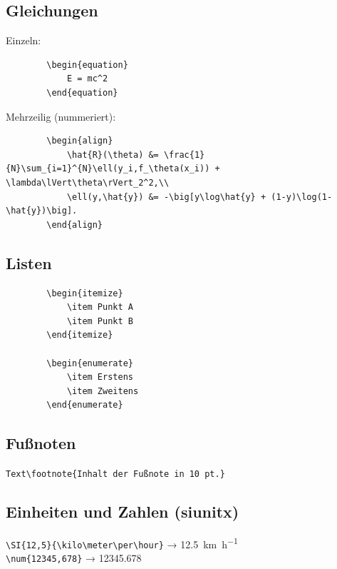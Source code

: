 \documentclass[11pt,a4paper]{article}
\begin{document}
    \subsection*{Gleichungen}
    Einzeln:
    \begin{verbatim}
        \begin{equation}
            E = mc^2
        \end{equation}
    \end{verbatim}

    Mehrzeilig (nummeriert):
    \begin{verbatim}
        \begin{align}
            \hat{R}(\theta) &= \frac{1}{N}\sum_{i=1}^{N}\ell(y_i,f_\theta(x_i)) + \lambda\lVert\theta\rVert_2^2,\\
            \ell(y,\hat{y}) &= -\big[y\log\hat{y} + (1-y)\log(1-\hat{y})\big].
        \end{align}
    \end{verbatim}

    \subsection*{Listen}
    \begin{verbatim}
        \begin{itemize}
            \item Punkt A
            \item Punkt B
        \end{itemize}

        \begin{enumerate}
            \item Erstens
            \item Zweitens
        \end{enumerate}
    \end{verbatim}

    \subsection*{Fußnoten}
    \verb|Text\footnote{Inhalt der Fußnote in 10 pt.}|

    \subsection*{Einheiten und Zahlen (siunitx)}
    \verb|\SI{12,5}{\kilo\meter\per\hour}| → \SI{12,5}{\kilo\meter\per\hour}\\
    \verb|\num{12345,678}| → \num{12345,678}
\end{document}

